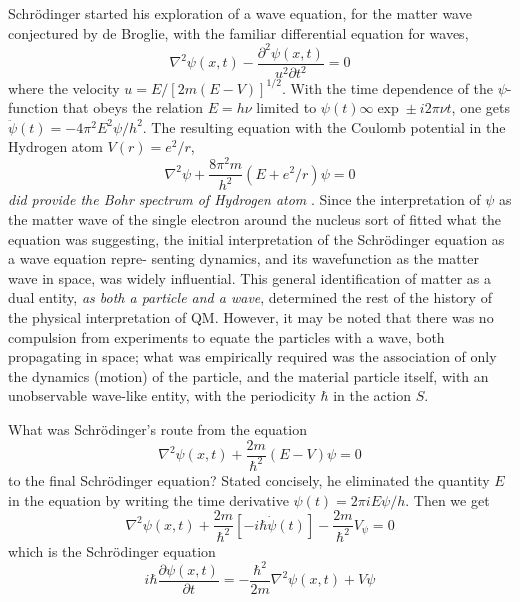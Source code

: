 Schr\"{o}dinger started his exploration of a wave equation, for the matter wave conjectured
by de Broglie, with the familiar differential equation for waves,
\begin{equation*}
\nabla^2 \psi (x,t) - \frac{\partial^2 \psi (x,t)}{u^2 \partial t^2} = 0 \tag{2}
\end{equation*}
where the velocity $u = E/ [2m(E - V )]^{1/2}$. With the time dependence of the $\psi$-function
that obeys the relation $E = h\nu$ limited to $\psi(t) \infty \exp \pm i2\pi \nu t$, one gets $\ddot{\psi} (t) = -4 \pi^2 E^2 \psi /h^2$.
The resulting equation with the Coulomb potential in the Hydrogen atom $V (r) = e^2 /r$,
\begin{equation*}
\nabla^2 \psi + \frac{8 \pi^2 m}{h^2} (E + e^2 / r) \psi = 0 \tag{3}
\end{equation*}
\textit{did provide the Bohr spectrum of Hydrogen atom} \cite{chap27-key1}. Since the interpretation of $\psi$ as the
matter wave of the single electron around the nucleus sort of fitted what the equation was
suggesting, the initial interpretation of the Schr\"{o}dinger equation as a wave equation repre-
senting dynamics, and its wavefunction as the matter wave in space, was widely influential.
This general identification of matter as a dual entity, \textit{as both a particle and a wave}, determined the rest of the history of the physical interpretation of QM. However, it may be noted that there was no compulsion from experiments to equate the particles with a wave,
both propagating in space; what was empirically required was the association of only the
dynamics (motion) of the particle, and the material particle itself, with an unobservable
wave-like entity, with the periodicity $\hbar$ in the action $S$.

What was Schr\"{o}dinger's route from the equation
\begin{equation*}
\nabla^2 \psi(x,t) + \frac{2m}{\hbar^2} (E-V) \psi = 0 \tag{4}
\end{equation*}
to the final Schr\"{o}dinger equation? Stated concisely, he eliminated the quantity $E$ in the
equation by writing the time derivative $\psi(t) = 2\pi i E \psi /h$. Then we get
\begin{equation*}
\nabla^2 \psi (x,t)  + \frac{2m}{\hbar^2} [-i \hbar \dot{\psi} (t)] - \frac{2m}{\hbar^2} V_{\psi} = 0 \tag{5}
\end{equation*}
which is the Schr\"{o}dinger equation
\begin{equation*}
i \hbar \frac{\partial \psi (x,t)}{\partial t} = - \frac{\hbar^2}{2m} \nabla^2 \psi (x,t) + V \psi  \tag{6}
\end{equation*}

